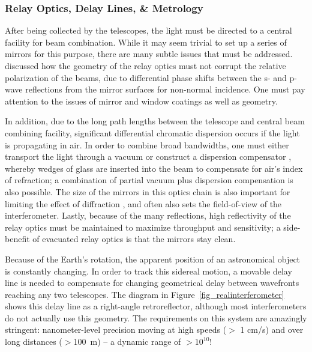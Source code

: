 \documentclass[12pt]{iopart}
\begin{document}
\subsubsection{Relay Optics, Delay Lines, \& Metrology}
\label{relay}

After being collected by the telescopes, the light must be directed to
a central facility for beam combination.  While it may seem trivial to
set up a series of mirrors for this purpose, there are many subtle
issues that must be addressed.  \citet{traub1988} discussed how the
geometry of the relay optics must not corrupt the relative
polarization of the beams, due to differential phase shifts between
the s- and p-wave reflections from the mirror surfaces for non-normal
incidence.  One must pay attention to the issues of mirror and
window coatings as well as geometry.

In addition, due to the long path lengths between the telescope and
central beam combining facility, significant differential chromatic 
dispersion
occurs if the light is propagating in air.  In order to combine broad
bandwidths, one must either transport the light through a vacuum or
construct a dispersion compensator \citep{tango1990,theo1995}, whereby
wedges of glass are inserted into the beam to compensate for air's
index of refraction; a combination of partial vacuum plus dispersion
compensation is also possible.  The size of the mirrors in this optics
chain is also important for limiting the effect of diffraction
\citep{horton2001}, and often also sets the field-of-view of the
interferometer.  Lastly, because of the many reflections, high
reflectivity of the relay optics must be maintained to maximize
throughput and sensitivity; a side-benefit of evacuated relay optics
is that the mirrors stay clean.

Because of the Earth's rotation, the apparent position of an
astronomical object is constantly changing.  In order to track this
sidereal motion, a movable delay line is needed to compensate for
changing geometrical delay between wavefronts reaching any two
telescopes.  The diagram in Figure~\ref{fig_realinterferometer} shows this delay line as a right-angle
retroreflector, although most interferometers do not actually use this
geometry.  The requirements on this system are amazingly stringent:
nanometer-level precision moving at high speeds ($>$ 1 cm/s) and over
long distances ($>$100~m) -- a dynamic range of $>10^{10}$!
\end{document}
